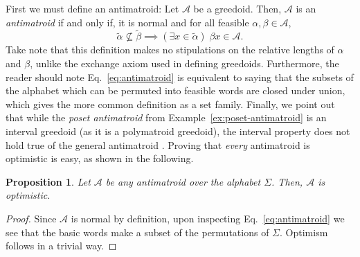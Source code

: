 \documentclass[11pt]{article}
\newtheorem{proposition}[theorem]{Proposition}
\newcommand{\univ}{\Sigma}
\begin{document}
\iffalse
First we must define an antimatroid:
Let $\mathcal{A}$ be a greedoid.
Then, $\mathcal{A}$ is an \emph{antimatroid} if and only if, it is normal and for all feasible $\alpha,\beta \in \mathcal{A}$,
\begin{equation}\label{eq:antimatroid}
    \widetilde{\alpha}\not\subseteq\widetilde{\beta} \implies (\exists x \in \widetilde{\alpha})\;\beta x \in\mathcal{A}.
\end{equation}
Take note that this definition makes no stipulations on the relative lengths of $\alpha$ and $\beta$, unlike the exchange axiom used in defining greedoids.
Furthermore, the reader should note Eq.~\ref{eq:antimatroid} is equivalent to saying that the subsets of the alphabet which can be permuted into feasible words are closed under union, which gives the more common definition as a set family.
Finally, we point out that while the \emph{poset antimatroid} from Example~\ref{ex:poset-antimatroid} is an interval greedoid (as it is a polymatroid greedoid), the interval property does not hold true of the general antimatroid \cite{korte2012greedoids}.
Proving that \emph{every} antimatroid is optimistic is easy, as shown in the following.
\begin{proposition}\label{prop:anti-optimism}
    Let $\mathcal{A}$ be any antimatroid over the alphabet $\univ$. Then, $\mathcal{A}$ is optimistic.
\end{proposition}
\begin{proof}    
    Since $\mathcal{A}$ is normal by definition, upon inspecting Eq.~\ref{eq:antimatroid} we see that the basic words make a subset of the permutations of $\univ$.
Optimism follows in a trivial way.
\end{proof}
\end{document}
